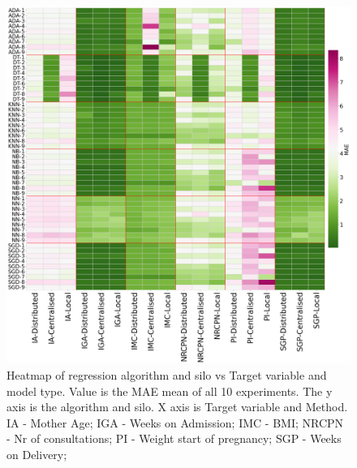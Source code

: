 \begin{figure}[htbp]
\centering
\captionsetup{justification=centering}

\caption[Heatmap of regression algorithm and silo vs Target variable and model type.]{Heatmap of regression algorithm and silo vs Target variable and model type. Value is the MAE mean of all 10 experiments. The y axis is the algorithm and silo. X axis is Target variable and Method. IA - Mother Age; IGA - Weeks on Admission; IMC - BMI; NRCPN - Nr of consultations; PI - Weight start of pregnancy; SGP - Weeks on Delivery;}\label{fig:heatmpa-int} 
\includegraphics[scale=0.22]{figures/heatmap-reg.png}
\end{figure}

